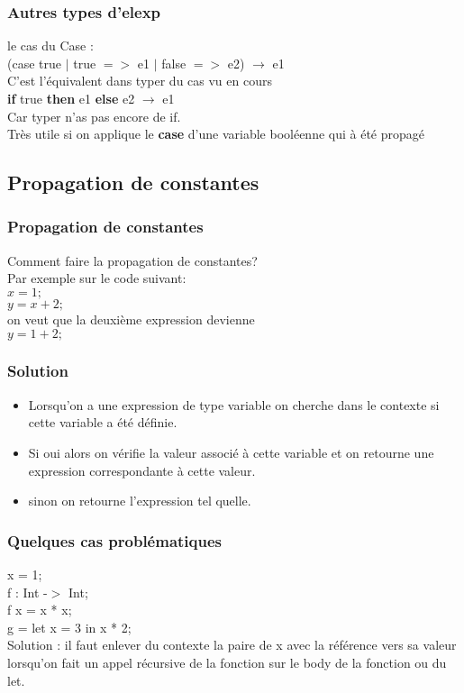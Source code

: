 \documentclass{beamer}
\begin{document}

\begin{frame}
\frametitle{Autres types d'elexp}
le cas du Case :\\
\bigskip
    (case true
    $|$ true $=>$ e1 
    $|$ false $=>$ e2) $\rightarrow$ e1\\
\bigskip
C'est l'équivalent dans typer du cas vu en cours \\
    \textbf{if} true \textbf{then} e1 \textbf{else} e2 $\rightarrow$ e1\\
Car typer n'as pas encore de if.\\
    \bigskip
    Très utile si on applique le \textbf{case} d'une variable booléenne qui à été propagé
\end{frame}

\subsection{Propagation de constantes} 

\begin{frame}
\frametitle{Propagation de constantes}
Comment faire la propagation de constantes?\\
Par exemple sur le code suivant:\\
$x = 1;$\\
\bigskip
$y = x + 2;$\\
\bigskip
on veut que la deuxième expression devienne \\
$y = 1 + 2;$\\

\end{frame}

\begin{frame}
\frametitle{Solution}
    \begin{itemize}
        \item Lorsqu'on a une expression de type variable on cherche dans le contexte si cette variable a été définie.
        \item Si oui alors on vérifie la valeur associé à cette variable et on retourne une expression correspondante à cette valeur.
        \item sinon on retourne l'expression tel quelle.
    \end{itemize}
\end{frame}

\begin{frame}
    \frametitle{Quelques cas problématiques}
    x = 1; \\
    \bigskip
    f : Int -$>$ Int;\\
    f x = x * x;\\
    \bigskip
    g = let x = 3 in x * 2;\\
    \bigskip
    Solution : il faut enlever du contexte la paire de x avec la référence vers sa valeur lorsqu'on fait un appel récursive
    de la fonction sur le body de la fonction ou du let.
\end{frame}
\end{document}

